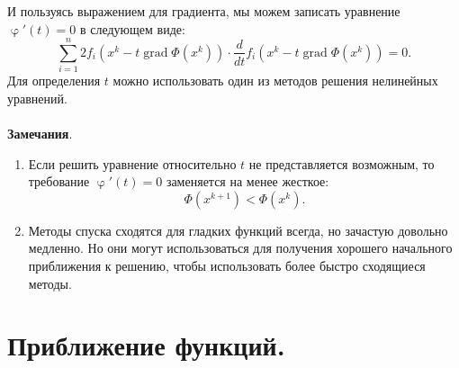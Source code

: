 \documentclass[a4paper, 12pt]{report}
\numberwithin{equation}{section}
\renewcommand{\varphi}{\upvarphi}
\begin{document}
И пользуясь выражением для градиента, мы можем записать уравнение $\varphi'(t) = 0$ в следующем виде: 
\begin{equation}
	\sum_{i=1}^{n} 2 f_i (x^k - t\operatorname{grad} \Phi(x^k))\cdot \dfrac{d}{dt}f_i(x^k - t\operatorname{grad} \Phi(x^k)) =0.
\end{equation}
Для определения $t$ можно использовать один из методов решения нелинейных уравнений.\\\\
\textbf{Замечания}.\begin{enumerate}
	\item Если решить уравнение относительно $t$ не представляется возможным, то требование $\varphi'(t) = 0$ заменяется на менее жесткое: $$\Phi(x^{k+1}) < \Phi(x^k).$$
	\item Методы спуска сходятся для гладких функций всегда, но зачастую довольно медленно. Но они могут использоваться для получения хорошего начального приближения к решению, чтобы использовать более быстро сходящиеся методы.
\end{enumerate}
\chapter{Приближение функций.}
\end{document}
